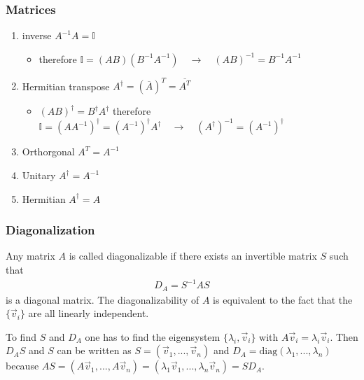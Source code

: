 \documentclass[10pt,a4paper]{article}
\theoremstyle{definition}
\begin{document}
\subsubsection{Matrices}
\begin{enumerate}
    \item inverse $A^{-1}A=\mathbb{I}$
    \begin{itemize}
        \item therefore $\mathbb{I}=(AB)(B^{-1}A^{-1})\quad\rightarrow\quad (AB)^{-1}=B^{-1}A^{-1}$
    \end{itemize}
    \item Hermitian transpose $A^\dagger = (\overline{A})^T = \overline{A^T}$
        \begin{itemize}
        \item $(AB)^\dagger=B^\dagger A^\dagger$ therefore $\mathbb{I}=(AA^{-1})^\dagger=(A^{-1})^\dagger A^\dagger\quad\rightarrow\quad (A^\dagger)^{-1}=(A^{-1})^\dagger$
    \end{itemize}
    \item Orthorgonal $A^T = A^{-1}$
    \item Unitary $A^\dagger = A^{-1}$
    \item Hermitian $A^\dagger = A$
\end{enumerate}

\subsubsection{Diagonalization}
Any  matrix $A$ is called diagonalizable if there exists an invertible matrix $S$ such that
\begin{align}
    D_A=S^{-1}AS
\end{align}
is a diagonal matrix. The diagonalizability of $A$ is equivalent to the fact that the $\{\vec{v}_i\}$ are all linearly independent.

To find $S$ and $D_A$ one has to find the eigensystem $\{\lambda_i,\vec{v}_i\}$ with $A\vec{v}_i=\lambda_i\vec{v}_i$. Then $D_AS$ and $S$ can be written as $S=(\vec{v}_1,...,\vec{v}_n)$ and $D_A=\text{diag}(\lambda_1,...,\lambda_n)$ because $AS=(A\vec{v}_1,...,A\vec{v}_n)=(\lambda_1\vec{v}_1,...,\lambda_n\vec{v}_n)=SD_A$.
\end{document}

